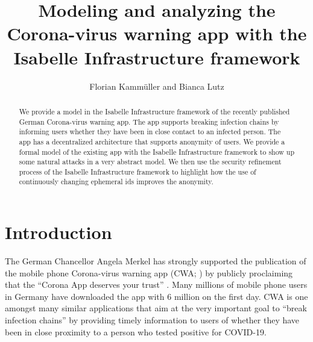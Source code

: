 \documentclass{llncs}
\begin{document}
\frontmatter
  
\mainmatter
\title{Modeling and analyzing the Corona-virus warning app with the Isabelle Infrastructure framework}
\author{Florian Kamm\"uller and Bianca Lutz}

\maketitle
\begin{abstract}
We provide a model in the Isabelle Infrastructure framework of the recently published German
Corona-virus warning app. The app supports breaking infection chains by informing users
whether they have been in close contact to an infected person. The app has a decentralized
architecture that supports anonymity of users.
We provide a formal model of the existing app with the Isabelle Infrastructure framework
to show up some natural attacks in a very abstract model. We then use the security
refinement process of the Isabelle Infrastructure framework to highlight how the use of
continuously changing ephemeral ids improves the anonymity.
\end{abstract}

\section{Introduction}
\label{sec:intro}
The German Chancellor Angela Merkel has strongly supported the publication of
the mobile phone Corona-virus warning app (CWA; \cite{cwa:github}) by publicly proclaiming that the ``Corona
App deserves your trust'' \cite{bundes:20}. Many millions of mobile phone users
in Germany have downloaded the app with 6 million on the first day.
CWA is one amongst many similar applications that aim at the very important goal
to ``break infection chains'' by providing timely information to users of whether they
have been in close proximity to a person who tested positive for COVID-19.
\end{document}
